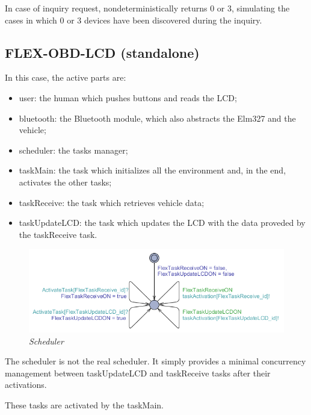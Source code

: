 \documentclass[paper=a4, fontsize=11pt]{scrartcl} %
\numberwithin{equation}{section} %
\numberwithin{figure}{section} %
\numberwithin{table}{section} %
\begin{document}
In case of inquiry request, nondeterministically returns 0 or 3, simulating the cases in which 0 or 3 devices have been discovered during the inquiry.

\subsection{FLEX-OBD-LCD (standalone)}

In this case, the active parts are:

\begin{itemize}
	\item user: the human which pushes buttons and reads the LCD;
	\item bluetooth: the Bluetooth module, which also abstracts the Elm327 and the vehicle;
	\item scheduler: the tasks manager;
	\item taskMain: the task which initializes all the environment and, in the end, activates the other tasks;
	\item taskReceive: the task which retrieves vehicle data;
	\item taskUpdateLCD: the task which updates the LCD with the data proveded by the taskReceive task.
\end{itemize}

\begin{figure}[H]
  \centering
  \includegraphics[width=6in]{img/FLEX-OBD-LCD_scheduler}
  \caption{\textit{Scheduler}}
\end{figure}

The scheduler is not the real scheduler. It simply provides a minimal concurrency management between taskUpdateLCD and taskReceive tasks after their activations.

These tasks are activated by the taskMain.
\end{document}
